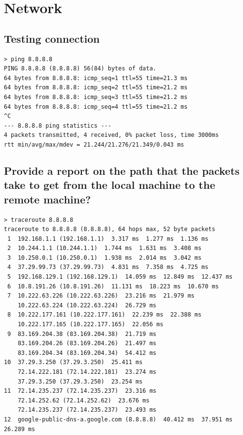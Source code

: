 \documentclass[10pt]{article}
\begin{document}
\section{Network}
\subsection{Testing connection}
\begin{verbatim}
> ping 8.8.8.8
PING 8.8.8.8 (8.8.8.8) 56(84) bytes of data.
64 bytes from 8.8.8.8: icmp_seq=1 ttl=55 time=21.3 ms
64 bytes from 8.8.8.8: icmp_seq=2 ttl=55 time=21.2 ms
64 bytes from 8.8.8.8: icmp_seq=3 ttl=55 time=21.2 ms
64 bytes from 8.8.8.8: icmp_seq=4 ttl=55 time=21.2 ms
^C
--- 8.8.8.8 ping statistics ---
4 packets transmitted, 4 received, 0% packet loss, time 3000ms
rtt min/avg/max/mdev = 21.244/21.276/21.349/0.043 ms
\end{verbatim}
\subsection{Provide a report on the path that the packets take to get from the local machine to the remote machine?}
\begin{verbatim}
> traceroute 8.8.8.8
traceroute to 8.8.8.8 (8.8.8.8), 64 hops max, 52 byte packets
 1  192.168.1.1 (192.168.1.1)  3.317 ms  1.277 ms  1.136 ms
 2  10.244.1.1 (10.244.1.1)  1.744 ms  1.631 ms  3.408 ms
 3  10.250.0.1 (10.250.0.1)  1.938 ms  2.014 ms  3.042 ms
 4  37.29.99.73 (37.29.99.73)  4.831 ms  7.358 ms  4.725 ms
 5  192.168.129.1 (192.168.129.1)  14.059 ms  12.849 ms  12.437 ms
 6  10.8.191.26 (10.8.191.26)  11.131 ms  18.223 ms  10.670 ms
 7  10.222.63.226 (10.222.63.226)  23.216 ms  21.979 ms
    10.222.63.224 (10.222.63.224)  26.729 ms
 8  10.222.177.161 (10.222.177.161)  22.239 ms  22.388 ms
    10.222.177.165 (10.222.177.165)  22.056 ms
 9  83.169.204.38 (83.169.204.38)  21.719 ms
    83.169.204.26 (83.169.204.26)  21.497 ms
    83.169.204.34 (83.169.204.34)  54.412 ms
10  37.29.3.250 (37.29.3.250)  25.411 ms
    72.14.222.181 (72.14.222.181)  23.274 ms
    37.29.3.250 (37.29.3.250)  23.254 ms
11  72.14.235.237 (72.14.235.237)  23.316 ms
    72.14.252.62 (72.14.252.62)  23.676 ms
    72.14.235.237 (72.14.235.237)  23.493 ms
12  google-public-dns-a.google.com (8.8.8.8)  40.412 ms  37.951 ms  26.289 ms
\end{verbatim}
\end{document}
